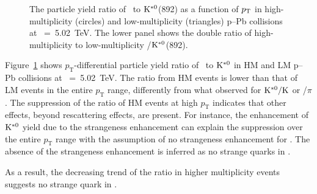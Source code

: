 \begin{figure}[!hbt]
	\centering
	\caption{The particle yield ratio of \fzero~to $\rm{}K^{*0}$(892) as a function of $p_{\rm{T}}$ in high-multiplicity (circles) and low-multiplicity (triangles) p--Pb collisions at \snn~=~5.02~TeV. The lower panel shows the double ratio of high-multiplicity to low-multiplicity \fzero/$\rm{}K^{*0}$(892).  }
	\label{fig:f0KsPt}
\end{figure}

Figure~\ref{fig:f0KsPt} shows $p_{\mathrm{T}}$-differential particle yield ratio of \fzero~to $\rm{}K^{*0}$ in HM and LM p--Pb collisions at \snn~=~5.02~TeV. The ratio from HM events is lower than that of LM events in the entire $p_{\mathrm{T}}$ range, differently from what observed for $\rm{}K^{*0}/K$ or \fzero/$\pi$. The suppression of the ratio of HM events at high $p_{\mathrm{T}}$ indicates that other effects, beyond rescattering effects, are present. For instance, the enhancement of $\rm{}K^{*0}$ yield due to the strangeness enhancement can explain the suppression over the entire $p_{\mathrm{T}}$ range with the assumption of no strangeness enhancement for \fzero. The absence of the strangeness enhancement is inferred as no strange quarks in \fzero.




As a result, the decreasing trend of the ratio in higher multiplicity events suggests no strange quark in \fzero.

